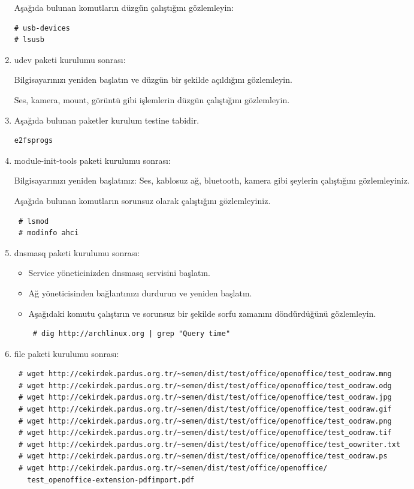 \documentclass[a4paper,10pt]{article}
\begin{document}
\begin{enumerate}
Aşağıda bulunan komutların düzgün çalıştığını gözlemleyin:
\begin{verbatim}
# usb-devices
# lsusb
\end{verbatim}


\item udev paketi kurulumu sonrası:

Bilgisayarınızı yeniden başlatın ve düzgün bir şekilde açıldığını gözlemleyin. 

Ses, kamera, mount, görüntü gibi işlemlerin düzgün çalıştığını gözlemleyin.
\item Aşağıda bulunan paketler kurulum testine tabidir.
\begin{verbatim}
e2fsprogs 
\end{verbatim}
\item module-init-tools paketi kurulumu sonrası:

Bilgisayarınızı yeniden başlatınız:
Ses, kablosuz ağ, bluetooth, kamera gibi şeylerin çalıştığını gözlemleyiniz.

Aşağıda bulunan komutların sorunsuz olarak çalıştığını gözlemleyiniz.
\begin{verbatim}
 # lsmod
 # modinfo ahci
\end{verbatim}


\item dnsmasq paketi kurulumu sonrası:

\begin{itemize}
 \item Service yöneticinizden dnsmasq servisini başlatın.
 \item Ağ yöneticisinden bağlantınızı durdurun ve yeniden başlatın.
 \item Aşağıdaki komutu çalıştırın ve sorunsuz bir şekilde sorfu zamanını döndürdüğünü gözlemleyin.
\begin{verbatim}
 # dig http://archlinux.org | grep "Query time"
\end{verbatim}

\end{itemize}


\item file paketi kurulumu sonrası:

\begin{verbatim}
 # wget http://cekirdek.pardus.org.tr/~semen/dist/test/office/openoffice/test_oodraw.mng
 # wget http://cekirdek.pardus.org.tr/~semen/dist/test/office/openoffice/test_oodraw.odg
 # wget http://cekirdek.pardus.org.tr/~semen/dist/test/office/openoffice/test_oodraw.jpg
 # wget http://cekirdek.pardus.org.tr/~semen/dist/test/office/openoffice/test_oodraw.gif
 # wget http://cekirdek.pardus.org.tr/~semen/dist/test/office/openoffice/test_oodraw.png
 # wget http://cekirdek.pardus.org.tr/~semen/dist/test/office/openoffice/test_oodraw.tif
 # wget http://cekirdek.pardus.org.tr/~semen/dist/test/office/openoffice/test_oowriter.txt
 # wget http://cekirdek.pardus.org.tr/~semen/dist/test/office/openoffice/test_oodraw.ps
 # wget http://cekirdek.pardus.org.tr/~semen/dist/test/office/openoffice/
   test_openoffice-extension-pdfimport.pdf
\end{verbatim}


\end{enumerate}
\end{document}
